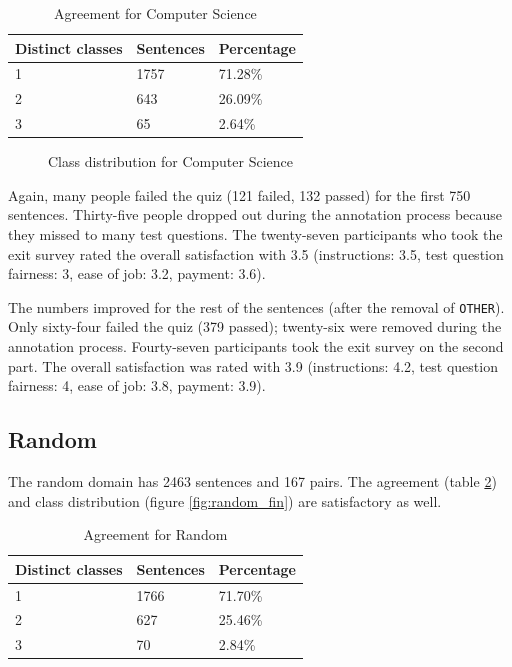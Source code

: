 \begin{table}[h]
\caption{Agreement for Computer Science}
\label{fig:compsci_agg}
\begin{tabularx}{\textwidth}{XXX}
\toprule
Distinct classes & Sentences & Percentage \\
\midrule
1 & 1757 & 71.28\%\\
2 & 643 & 26.09\%\\
3 & 65 & 2.64\%\\
\bottomrule
\end{tabularx}
\end{table}


\begin{figure}[h]
\centering
\caption{Class distribution for Computer Science}
\label{fig:compsci_fin}
\end{figure}

Again, many people failed the quiz (121 failed, 132 passed) for the first 750 sentences. Thirty-five people dropped out during the annotation process because they missed to many test questions. The twenty-seven participants who took the exit survey rated the overall satisfaction with 3.5 (instructions: 3.5, test question fairness: 3, ease of job: 3.2, payment: 3.6).

The numbers improved for the rest of the sentences (after the removal of \texttt{OTHER}). Only sixty-four failed the quiz (379 passed); twenty-six were removed during the annotation process. Fourty-seven participants took the exit survey on the second part. The overall satisfaction was rated with 3.9 (instructions: 4.2, test question fairness: 4, ease of job: 3.8, payment: 3.9).

\subsection{Random}
The random domain has 2463 sentences and 167 pairs. The agreement (table \ref{fig:random_agg}) and class distribution (figure \ref{fig:random_fin}) are satisfactory as well.
    
\begin{table}[h]
\caption{Agreement for Random}
\label{fig:random_agg}
\begin{tabularx}{\textwidth}{XXX}
\toprule
Distinct classes & Sentences & Percentage \\
\midrule
1 & 1766 & 71.70\%\\
2 & 627 & 25.46\%\\
3 & 70 & 2.84\%\\
\bottomrule
\end{tabularx}
\end{table}


